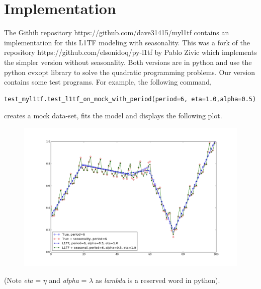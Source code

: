\documentclass{article}
\begin{document}
\section{Implementation}
The Githib repository https://github.com/dave31415/myl1tf contains an implementation for this
L1TF modeling with seasonality. This was a fork of the repository
https://github.com/elsonidoq/py-l1tf by Pablo Zivic which implements the
simpler version without seasonality. Both versions are in python and
use the python cvxopt library to solve the quadratic programming problems. Our
version contains some test programs. For example, the following command,
\begin{verbatim}
test_myl1tf.test_l1tf_on_mock_with_period(period=6, eta=1.0,alpha=0.5)
\end{verbatim}
creates a mock data-set, fits the model and displays the following plot.
\begin{figure}
\centering
\includegraphics[width=500pt]{example.png}
\end{figure}
(Note \emph{eta} = $\eta$ and \emph{alpha} = $\lambda$ as \emph{lambda} is a reserved word in python).
\end{document}
